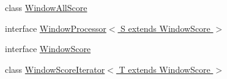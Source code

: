 \begin{DoxyCompactItemize}
\item 
class \hyperlink{classumms_1_1core_1_1model_1_1score_1_1_window_all_score}{Window\+All\+Score}
\item 
interface \hyperlink{interfaceumms_1_1core_1_1model_1_1score_1_1_window_processor_3_01_s_01extends_01_window_score_01_4}{Window\+Processor$<$ S extends Window\+Score $>$}
\item 
interface \hyperlink{interfaceumms_1_1core_1_1model_1_1score_1_1_window_score}{Window\+Score}
\item 
class \hyperlink{classumms_1_1core_1_1model_1_1score_1_1_window_score_iterator_3_01_t_01extends_01_window_score_01_4}{Window\+Score\+Iterator$<$ T extends Window\+Score $>$}
\end{DoxyCompactItemize}
